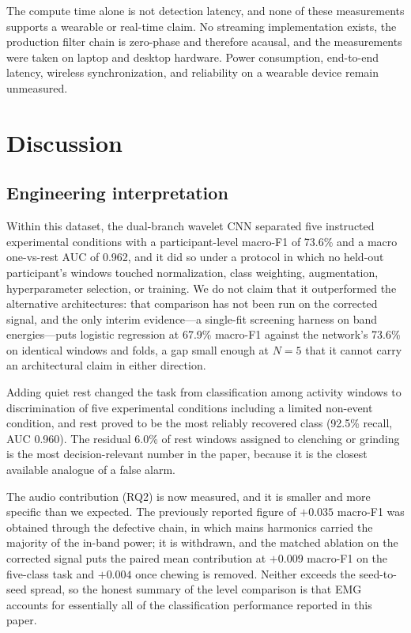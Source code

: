 \documentclass[pdflatex,sn-nature,iicol]{sn-jnl}
\begin{document}
The compute time alone is not detection latency, and none of these measurements supports a wearable or real-time claim. No streaming implementation exists, the production filter chain is zero-phase and therefore acausal, and the measurements were taken on laptop and desktop hardware. Power consumption, end-to-end latency, wireless synchronization, and reliability on a wearable device remain unmeasured.

\section{Discussion}

\subsection{Engineering interpretation}

Within this dataset, the dual-branch wavelet CNN separated five instructed experimental conditions with a participant-level macro-F1 of 73.6\% and a macro one-vs-rest AUC of 0.962, and it did so under a protocol in which no held-out participant's windows touched normalization, class weighting, augmentation, hyperparameter selection, or training. We do not claim that it outperformed the alternative architectures: that comparison has not been run on the corrected signal, and the only interim evidence---a single-fit screening harness on band energies---puts logistic regression at 67.9\% macro-F1 against the network's 73.6\% on identical windows and folds, a gap small enough at $N=5$ that it cannot carry an architectural claim in either direction.

Adding quiet rest changed the task from classification among activity windows to discrimination of five experimental conditions including a limited non-event condition, and rest proved to be the most reliably recovered class (92.5\% recall, AUC 0.960). The residual 6.0\% of rest windows assigned to clenching or grinding is the most decision-relevant number in the paper, because it is the closest available analogue of a false alarm.

The audio contribution (RQ2) is now measured, and it is smaller and more specific than we expected. The previously reported figure of $+0.035$ macro-F1 was obtained through the defective chain, in which mains harmonics carried the majority of the in-band power; it is withdrawn, and the matched ablation on the corrected signal puts the paired mean contribution at $+0.009$ macro-F1 on the five-class task and $+0.004$ once chewing is removed. Neither exceeds the seed-to-seed spread, so the honest summary of the level comparison is that EMG accounts for essentially all of the classification performance reported in this paper.
\end{document}
